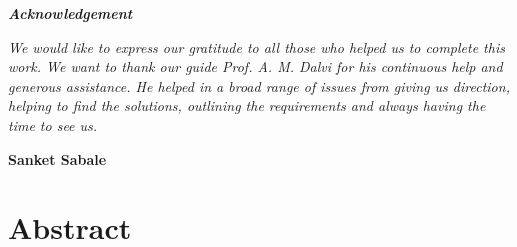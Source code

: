 \documentclass[12pt,a4paper]{report}
\begin{document}
\begin{center}
\newpage

\pagebreak
\hspace{0pt}
\vfill
{\LARGE \textbf{\textit{Acknowledgement}}}

\begin{FlushLeft}
{\large \textit{
\quad We would like to express our gratitude to all those who helped us to complete
this work. We want to thank our guide Prof. A. M. Dalvi for his continuous help and 
generous assistance. He helped in a broad range of issues from giving us
direction, helping to find the solutions, outlining the requirements and always
having the time to see us.
}}
\\

\end{FlushLeft}


\begin{FlushRight}

{\large \textbf{Sanket Sabale}}

\end{FlushRight}



\vfill
\hspace{0pt}
\pagebreak
\end{center}


\newpage 
{}


\setlength{\headheight}{20pt}
 
\pagestyle{fancyplain}
\renewcommand{\chaptermark}[1]{\markboth{#1}{}}
 
\lhead{\fancyplain{}}
\chead{}
\rhead{\fancyplain{}{\textit{\leftmark}}}
\lfoot{}
\cfoot{\thepage}
\rfoot{}




\tableofcontents
\newpage

\chapter*{\centering Abstract}
\end{document}
